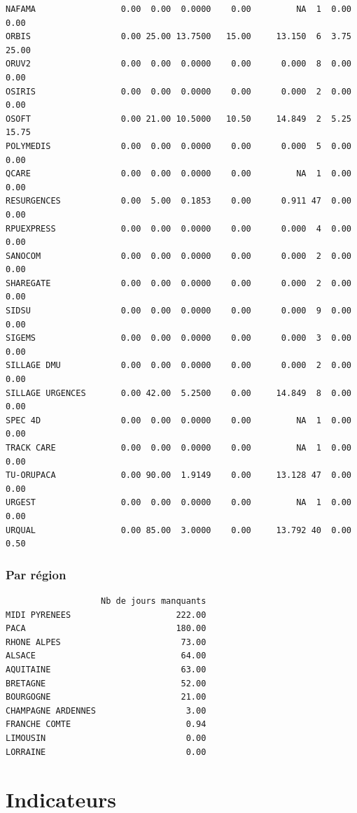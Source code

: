 \documentclass[]{article}
\begin{document}
\begin{verbatim}
NAFAMA                 0.00  0.00  0.0000    0.00         NA  1  0.00  0.00
ORBIS                  0.00 25.00 13.7500   15.00     13.150  6  3.75 25.00
ORUV2                  0.00  0.00  0.0000    0.00      0.000  8  0.00  0.00
OSIRIS                 0.00  0.00  0.0000    0.00      0.000  2  0.00  0.00
OSOFT                  0.00 21.00 10.5000   10.50     14.849  2  5.25 15.75
POLYMEDIS              0.00  0.00  0.0000    0.00      0.000  5  0.00  0.00
QCARE                  0.00  0.00  0.0000    0.00         NA  1  0.00  0.00
RESURGENCES            0.00  5.00  0.1853    0.00      0.911 47  0.00  0.00
RPUEXPRESS             0.00  0.00  0.0000    0.00      0.000  4  0.00  0.00
SANOCOM                0.00  0.00  0.0000    0.00      0.000  2  0.00  0.00
SHAREGATE              0.00  0.00  0.0000    0.00      0.000  2  0.00  0.00
SIDSU                  0.00  0.00  0.0000    0.00      0.000  9  0.00  0.00
SIGEMS                 0.00  0.00  0.0000    0.00      0.000  3  0.00  0.00
SILLAGE DMU            0.00  0.00  0.0000    0.00      0.000  2  0.00  0.00
SILLAGE URGENCES       0.00 42.00  5.2500    0.00     14.849  8  0.00  0.00
SPEC 4D                0.00  0.00  0.0000    0.00         NA  1  0.00  0.00
TRACK CARE             0.00  0.00  0.0000    0.00         NA  1  0.00  0.00
TU-ORUPACA             0.00 90.00  1.9149    0.00     13.128 47  0.00  0.00
URGEST                 0.00  0.00  0.0000    0.00         NA  1  0.00  0.00
URQUAL                 0.00 85.00  3.0000    0.00     13.792 40  0.00  0.50
\end{verbatim}

\subsubsection{Par région}\label{par-region}

\begin{verbatim}
                   Nb de jours manquants
MIDI PYRENEES                     222.00
PACA                              180.00
RHONE ALPES                        73.00
ALSACE                             64.00
AQUITAINE                          63.00
BRETAGNE                           52.00
BOURGOGNE                          21.00
CHAMPAGNE ARDENNES                  3.00
FRANCHE COMTE                       0.94
LIMOUSIN                            0.00
LORRAINE                            0.00
\end{verbatim}

\section{Indicateurs}\label{indicateurs}
\end{document}

